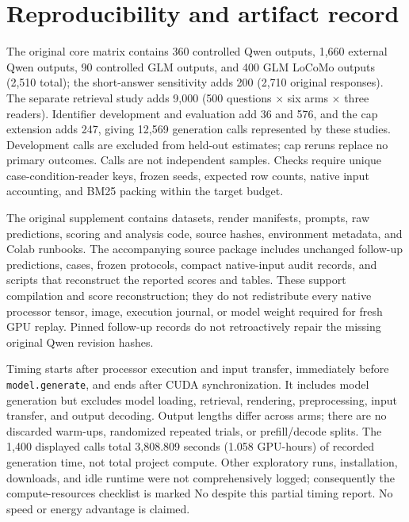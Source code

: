 \documentclass{article}
\begin{document}
\section{Reproducibility and artifact record}
\label{app:resources}

The original core matrix contains 360 controlled Qwen outputs, 1,660 external Qwen outputs, 90 controlled GLM outputs, and 400 GLM LoCoMo outputs (2,510 total); the short-answer sensitivity adds 200 (2,710 original responses). The separate retrieval study adds 9,000 (500 questions $\times$ six arms $\times$ three readers). Identifier development and evaluation add 36 and 576, and the cap extension adds 247, giving 12,569 generation calls represented by these studies. Development calls are excluded from held-out estimates; cap reruns replace no primary outcomes. Calls are not independent samples. Checks require unique case-condition-reader keys, frozen seeds, expected row counts, native input accounting, and BM25 packing within the target budget.

The original supplement contains datasets, render manifests, prompts, raw predictions, scoring and analysis code, source hashes, environment metadata, and Colab runbooks. The accompanying source package includes unchanged follow-up predictions, cases, frozen protocols, compact native-input audit records, and scripts that reconstruct the reported scores and tables. These support compilation and score reconstruction; they do not redistribute every native processor tensor, image, execution journal, or model weight required for fresh GPU replay. Pinned follow-up records do not retroactively repair the missing original Qwen revision hashes.

\begin{table}[H]
  \centering\small
  \caption{Original LoCoMo-100 mean synchronized generation time in seconds per question on A100-SXM4-40GB (100 calls per available cell). The missing GLM selected-text cell was not run. These are descriptive single-pass measurements, not an end-to-end or controlled speed benchmark.}
  \label{tab:latency}
  
\end{table}

Timing starts after processor execution and input transfer, immediately before \texttt{model.generate}, and ends after CUDA synchronization. It includes model generation but excludes model loading, retrieval, rendering, preprocessing, input transfer, and output decoding. Output lengths differ across arms; there are no discarded warm-ups, randomized repeated trials, or prefill/decode splits. The 1,400 displayed calls total 3,808.809 seconds (1.058 GPU-hours) of recorded generation time, not total project compute. Other exploratory runs, installation, downloads, and idle runtime were not comprehensively logged; consequently the compute-resources checklist is marked No despite this partial timing report. No speed or energy advantage is claimed.
\end{document}
